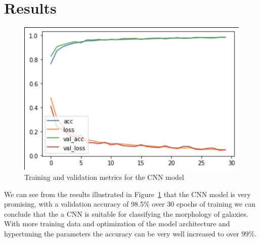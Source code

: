 \section{Results}
\label{sec:res}
\begin{figure}[h]
	\centering
	\captionsetup{justification=centering}
	\includegraphics[width=0.4\columnwidth]{Figures/CNNMetrics.png}
	\caption{Training and validation metrics for the CNN model}
	\label{fig:cnnmetrics}
\end{figure}

We can see from the results illustrated in Figure~\ref{fig:cnnmetrics} that the CNN model is very promising, with a validation accuracy of 98.5\% over 30 epochs of training we can conclude that the a CNN is suitable for classifying the morphology of galaxies. With more training data and optimization of the model architecture and hypertuning the parameters the accuracy can be very well increased to over 99\%.